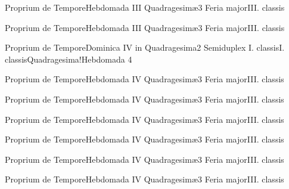 \documentclass[liber-responsorialis_hiemalis.tex]{subfiles}
\begin{document}
	{Proprium de Tempore}{Hebdomada III Quadragesimæ}{3}{}
	{Feria major}{III. classis}{}
	{}
	{}

	{Proprium de Tempore}{Hebdomada III Quadragesimæ}{3}{}
	{Feria major}{III. classis}{}
	{}
	{}

	{Proprium de Tempore}{Dominica IV in Quadragesima}{2}{}
	{Semiduplex I. classis}{I. classis}{Quadragesima!Hebdomada 4}
	{}
	{}

	{Proprium de Tempore}{Hebdomada IV Quadragesimæ}{3}{}
	{Feria major}{III. classis}{}
	{}
	{}

	{Proprium de Tempore}{Hebdomada IV Quadragesimæ}{3}{}
	{Feria major}{III. classis}{}
	{}
	{}

	{Proprium de Tempore}{Hebdomada IV Quadragesimæ}{3}{}
	{Feria major}{III. classis}{}
	{}
	{}

	{Proprium de Tempore}{Hebdomada IV Quadragesimæ}{3}{}
	{Feria major}{III. classis}{}
	{}
	{}

	{Proprium de Tempore}{Hebdomada IV Quadragesimæ}{3}{}
	{Feria major}{III. classis}{}
	{}
	{}

	{Proprium de Tempore}{Hebdomada IV Quadragesimæ}{3}{}
	{Feria major}{III. classis}{}
	{}
	{}
\end{document}
